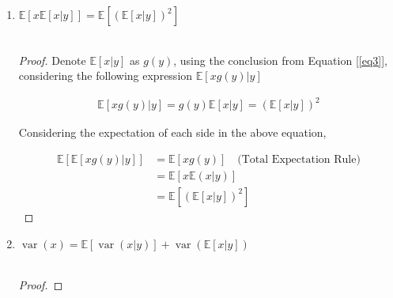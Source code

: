 \documentclass[a4paper]{article}
\begin{document}
\begin{enumerate}
\begin{enumerate}
\begin{enumerate}
\begin{proof}
      \begin{equation}\label{eq3}
        \begin{aligned}
          \mathbb{E}[xg(y) |y]& = \sum_{x} xg(y) P_{X|Y}(x|y) \\
          & = g(y)\sum_{x} x P_{X|Y}(x|y) \quad (g(y) \text{ is constant with } y \text{ fixed)}\\
          & = g(y) \mathbb{E} [x|y]
        \end{aligned}
      \end{equation}

    \end{proof}

      \item  $\mathbb{E}[x\mathbb{E}[x|y]]=\mathbb{E}\left[(\mathbb{E}[x | y])^{2}\right]$
      \\~

      \begin{proof}

      Denote $\mathbb{E}[x|y]$ as $g(y)$, using the conclusion from Equation [\ref{eq3}], considering the following expression $\mathbb{E}[xg(y)|y]$

      \begin{equation}
        \begin{aligned}
          \mathbb{E}[xg(y)|y ] =  g(y) \mathbb{E}[x|y] = (\mathbb{E}[x|y])^2
        \end{aligned}
      \end{equation}

      Considering the expectation of each side in the above equation,

      \begin{equation}
        \begin{aligned}
          \mathbb{E}[\mathbb{E}[xg(y)|y ] ] & = \mathbb{E}[xg(y)] \quad \text{(Total Expectation Rule)}  \\
          & = \mathbb{E}[x\mathbb{E}(x|y)] \\
          & = \mathbb{E}[{(\mathbb{E}[x|y])^2}]
        \end{aligned}
      \end{equation}
    \end{proof}
      
    \item $\operatorname{var}(x)=\mathbb{E}[\operatorname{var}(x | y)]+\operatorname{var}(\mathbb{E}[x|y]) $
      \\~

      \begin{proof}


\end{proof}
\end{enumerate}
\end{enumerate}
\end{enumerate}
\end{document}
